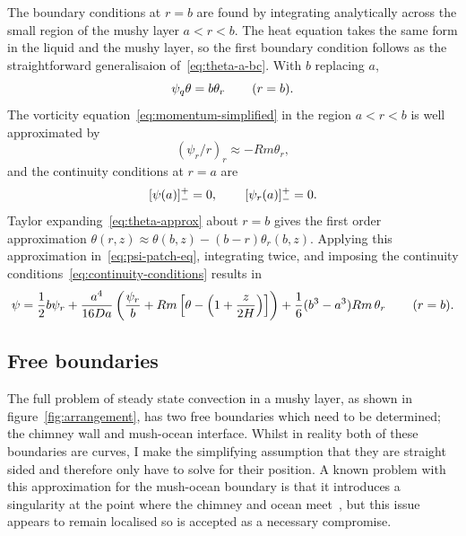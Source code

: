 \documentclass[11pt]{proc}
\begin{document}
The boundary conditions at $r=b$ are found by integrating analytically across the small region of the mushy layer $a < r < b$. The heat equation takes the same form in the liquid and the mushy layer, so the first boundary condition follows as the straightforward generalisaion of~\ref{eq:theta-a-bc}. With $b$ replacing $a$,
\begin{equation}
\psi_q \theta = b \theta_r  \hspace{5ex} (r=b).
\end{equation}
The vorticity equation~\eqref{eq:momentum-simplified} in the region $a < r < b$ is well approximated by
\begin{equation}
\label{eq:psi-patch-eq}
(\psi_r/r)_r \approx -Rm \theta_r,
\end{equation}
and the continuity conditions at $r=a$ are
\begin{equation}
\label{eq:continuity-conditions}
[\psi(a)]_-^+ = 0, \hspace{5ex} [\psi_r(a)]_-^+ = 0.
\end{equation}
Taylor expanding~\eqref{eq:theta-approx} about $r=b$ gives the first order approximation $\theta(r, z) \approx \theta(b, z) - (b-r) \theta_r(b, z)$. Applying this approximation in~\eqref{eq:psi-patch-eq}, integrating twice, and imposing the continuity conditions~\eqref{eq:continuity-conditions} results in
\begin{equation}
  \psi = \frac{1}{2} b \psi_r + \frac{a^4}{16 Da} \left(  \frac{\psi_r}{b}  +   Rm \left[ \theta - \left( 1 + \frac{z}{2H} \right) \right]  \right)  + \frac{1}{6} (b^3-a^3) Rm \, \theta_r \hspace{5ex} (r=b).
\end{equation}

\subsection{Free boundaries}
\label{sec:free-boundaries-theory}

The full problem of steady state convection in a mushy layer, as shown in figure~\ref{fig:arrangement}, has two free boundaries which need to be determined; the chimney wall and mush-ocean interface. Whilst in reality both of these boundaries are curves, I make the simplifying assumption that they are straight sided and therefore only have to solve for their position. A known problem with this approximation for the mush-ocean boundary is that it introduces a singularity at the point where the chimney and ocean meet~\citep*{schulze-worster-98}, but this issue appears to remain localised so is accepted as a necessary compromise.
\end{document}
